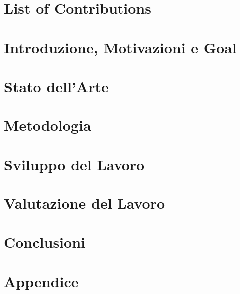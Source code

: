 \documentclass[12pt,twoside]{report}
\begin{document}

\tableofcontents
\clearpage\pagestyle{empty}\mbox{}\clearpage
\listoffigures
\clearpage\pagestyle{empty}\mbox{}\clearpage
\listoftables
\clearpage\pagestyle{empty}\mbox{}\clearpage
\chapter*{List of Contributions}

\clearpage\pagestyle{empty}\mbox{}\clearpage
\chapter{Introduzione, Motivazioni e Goal}

\clearpage\pagestyle{empty}\mbox{}\clearpage
\chapter{Stato dell'Arte}

\chapter{Metodologia}

\chapter{Sviluppo del Lavoro}

\chapter{Valutazione del Lavoro}

\chapter{Conclusioni}

\appendix
\chapter{Appendice}

\printbibliography 
\end{document}

